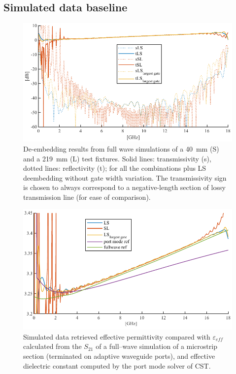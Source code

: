 \documentclass[11pt,a4paper]{article}
\begin{document}
    \subsection{Simulated data baseline}
    \label{subsec:simulation}
    \begin{figure}[!t]
        \includegraphics[width=\textwidth]{sparasim}
        \caption{De-embedding results from full wave simulations of a 40~mm (S) and a 219~mm (L) test fixtures.
        Solid lines: transmissivity (s), dotted lines: reflectivity (t); for all the combinations plus LS deembedding
        without gate width variation. The transmissivity sign is chosen to always correspond to a negative-length section
        of lossy transmission line (for ease of comparison).}
        \label{fig:sparasim}
    \end{figure}
    \begin{figure}[!tb]
        \includegraphics[width=\textwidth]{epsisim}
        \caption{Simulated data retrieved effective permittivity compared with $\varepsilon_{eff}$ calculated from
        the $S_{21}$ of a full--wave simulation of a microstrip section (terminated on adaptive waveguide ports),
            and effective dielectric constant computed by the port mode solver of CST.}
        \label{fig:epsilonsim}
    \end{figure}
\end{document}
